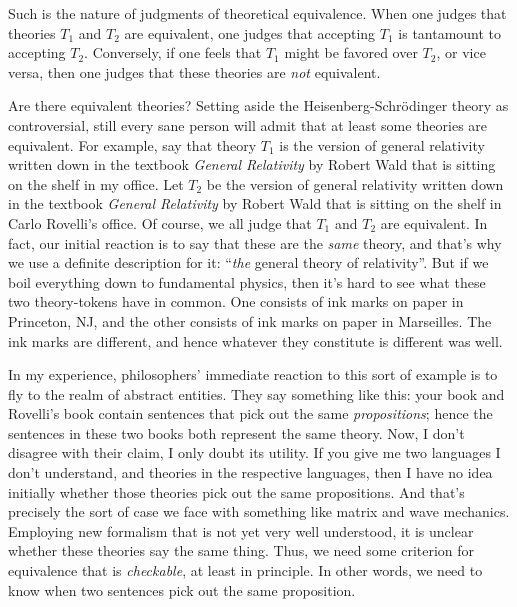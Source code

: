 Such is the nature of judgments of theoretical equivalence.  When one
judges that theories $T_1$ and $T_2$ are equivalent, one judges that
accepting $T_1$ is tantamount to accepting $T_2$.  Conversely, if one
feels that $T_1$ might be favored over $T_2$, or vice versa, then one
judges that these theories are {\it not} equivalent.

Are there equivalent theories?  Setting aside the
Heisenberg-Schr{\"o}dinger theory as controversial, still every sane
person will admit that at least some theories are equivalent.  For
example, say that theory $T_1$ is the version of general relativity
written down in the textbook {\it General Relativity} by Robert Wald
that is sitting on the shelf in my office.  Let $T_2$ be the version
of general relativity written down in the textbook {\it General
  Relativity} by Robert Wald that is sitting on the shelf in Carlo
Rovelli's office.  Of course, we all judge that $T_1$ and $T_2$ are
equivalent.  In fact, our initial reaction is to say that these are
the {\it same} theory, and that's why we use a definite description
for it: ``{\it the} general theory of relativity''.  But if we boil
everything down to fundamental physics, then it's hard to see what
these two theory-tokens have in common.  One consists of ink marks on
paper in Princeton, NJ, and the other consists of ink marks on paper
in Marseilles.  The ink marks are different, and hence whatever they
constitute is different was well.

In my experience, philosophers' immediate reaction to this sort of
example is to fly to the realm of abstract entities.  They say
something like this: your book and Rovelli's book contain sentences
that pick out the same {\it propositions}; hence the sentences in
these two books both represent the same theory.  Now, I don't disagree
with their claim, I only doubt its utility.  If you give me two
languages I don't understand, and theories in the respective
languages, then I have no idea initially whether those theories pick
out the same propositions.  And that's precisely the sort of case we
face with something like matrix and wave mechanics.  Employing new
formalism that is not yet very well understood, it is unclear whether
these theories say the same thing.  Thus, we need some criterion for
equivalence that is {\it checkable}, at least in principle.  In other
words, we need to know when two sentences pick out the same
proposition.

